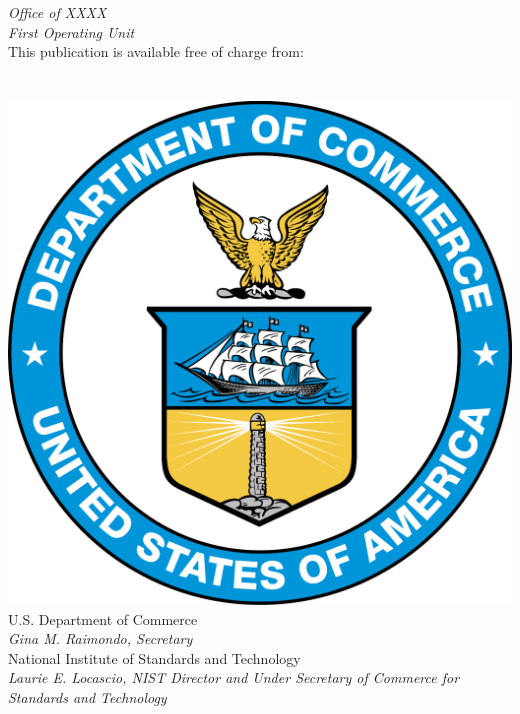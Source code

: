 \begin{titlepage}
\begin{flushright}
            \textit{Office of XXXX}\\
            \textit{First Operating Unit}\\
            \vfill
            \normalsize This publication is available free of charge from:\\
            \DOI\\
            \vfill
            \normalsize \pubmonth~\pubyear\\
            \vfill
            \includegraphics[width=0.2\linewidth]{Figures/Logos/DoC-logo.pdf}\\ 
            \vfill
            \footnotesize U.S. Department of Commerce\\ 
            \textit{Gina M. Raimondo, Secretary}\\
            \vspace{10pt}
            National Institute of Standards and Technology\\ 
            \hspace*{-3cm}\textit{Laurie E. Locascio, NIST Director and Under Secretary of Commerce for Standards and Technology}  
        \end{flushright}
        

\end{titlepage}
